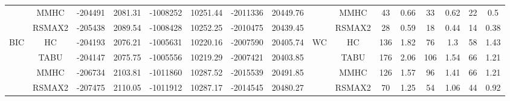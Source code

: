 \begin{table}[p]
{\begin{tabular}{cc||cc|cc|cc||cc|cc|cc|cc}
& MMHC &	-204491 & 	2081.31 & 	-1008252 & 	10251.44 & 	-2011336 & 	20449.76 & 	& MMHC &	43 & 	0.66 & 	33 & 	0.62 & 	22 & 	0.5\tabularnewline													
& RSMAX2 &	-205438 & 	2089.54 & 	-1008428 & 	10252.25 & 	-2010475 & 	20439.45 & 	& RSMAX2 &	28 & 	0.59 & 	18 & 	0.44 & 	14 & 	0.38\tabularnewline													
\hline																										
\multirow{4}{*}{BIC} & HC &	-204193 & 	2076.21 & 	-1005631 & 	10220.16 & 	-2007590 & 	20405.74 & 	\multirow{4}{*}{WC} & HC &	136 & 	1.82 & 	76 & 	1.3 & 	58 & 	1.43\tabularnewline													
& TABU &	-204147 & 	2075.75 & 	-1005556 & 	10219.29 & 	-2007421 & 	20403.85 & 	& TABU &	176 & 	2.06 & 	106 & 	1.54 & 	66 & 	1.21\tabularnewline													
& MMHC &	-206734 & 	2103.81 & 	-1011860 & 	10287.52 & 	-2015539 & 	20491.85 & 	& MMHC &	126 & 	1.57 & 	96 & 	1.41 & 	66 & 	1.21\tabularnewline													
& RSMAX2 &	-207475 & 	2110.05 & 	-1011912 & 	10287.17 & 	-2014545 & 	20480.27 & 	& RSMAX2 &	70 & 	1.25 & 	54 & 	1.06 & 	44 & 	0.92\tabularnewline													
\hline																										
\end{tabular}																										
}																										
\end{table}																										


